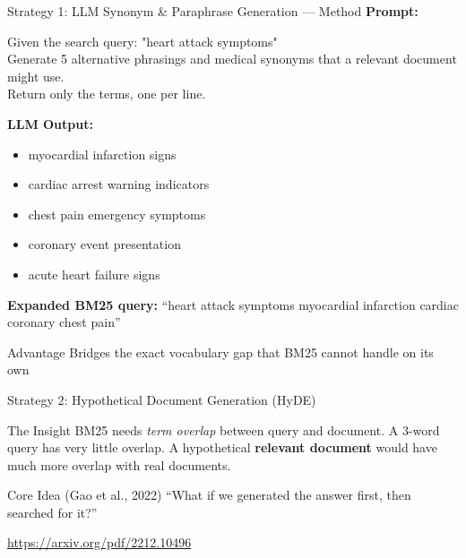 \documentclass[aspectratio=169]{beamer}
\newif\ifanimated
\newcommand{\cpause}{\ifanimated\pause\fi}
\begin{document}
\begin{frame}[shrink=25]{Strategy 1: LLM Synonym \& Paraphrase Generation --- Method}
\textbf{Prompt:}
\begin{tcolorbox}[colback=gray!10, colframe=gray!50, fontupper=\small\ttfamily]
Given the search query: "heart attack symptoms"\\
Generate 5 alternative phrasings and medical synonyms that a relevant document might use.\\
Return only the terms, one per line.
\end{tcolorbox}

\vspace{0.5em}

\textbf{LLM Output:}
\begin{itemize}
    \item myocardial infarction signs
    \item cardiac arrest warning indicators
    \item chest pain emergency symptoms
    \item coronary event presentation
    \item acute heart failure signs
\end{itemize}\cpause

\vspace{0.5em}

\textbf{Expanded BM25 query:} ``heart attack symptoms myocardial infarction cardiac coronary chest pain''

\begin{exampleblock}{Advantage}
Bridges the exact vocabulary gap that BM25 cannot handle on its own
\end{exampleblock}
\end{frame}

\begin{frame}[shrink=25]{Strategy 2: Hypothetical Document Generation (HyDE)}
\begin{block}{The Insight}
BM25 needs \emph{term overlap} between query and document. A 3-word query has very little overlap. A hypothetical \textbf{relevant document} would have much more overlap with real documents.
\end{block}

\vspace{0.5em}
\cpause
\begin{exampleblock}{Core Idea (Gao et al., 2022)}
``What if we generated the answer first, then searched for it?''
\end{exampleblock}

\url{https://arxiv.org/pdf/2212.10496}

\end{frame}
\end{document}

